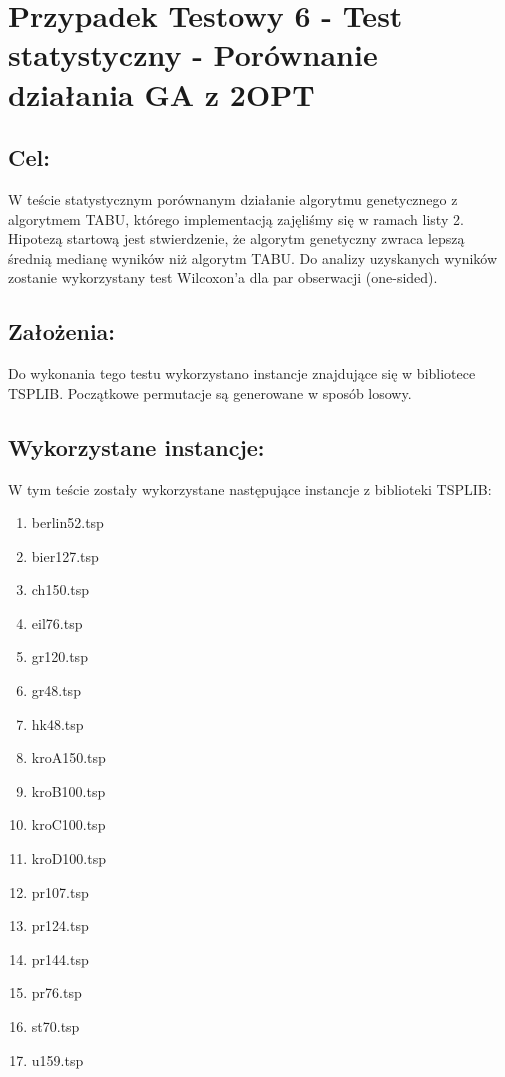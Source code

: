 \section{Przypadek Testowy 6 - Test statystyczny - Porównanie działania GA z 2OPT}
  \subsection{Cel:}
    W teście statystycznym porównanym działanie algorytmu genetycznego z algorytmem TABU,
    którego implementacją zajęliśmy się w ramach listy 2. Hipotezą startową jest stwierdzenie, że
    algorytm genetyczny zwraca lepszą średnią medianę wyników niż algorytm TABU. Do analizy
    uzyskanych wyników zostanie wykorzystany test Wilcoxon'a dla par obserwacji (one-sided).
  \subsection{Założenia: }
    Do wykonania tego testu wykorzystano instancje znajdujące się w bibliotece TSPLIB. Początkowe permutacje są generowane w sposób
    losowy.
  \subsection{Wykorzystane instancje: }
    W tym teście zostały wykorzystane następujące instancje z biblioteki TSPLIB:
    \begin{enumerate}
      \item berlin52.tsp
      \item bier127.tsp
      \item ch150.tsp
      \item eil76.tsp
      \item gr120.tsp
      \item gr48.tsp
      \item hk48.tsp
      \item kroA150.tsp
      \item kroB100.tsp
      \item kroC100.tsp
      \item kroD100.tsp
      \item pr107.tsp
      \item pr124.tsp
      \item pr144.tsp
      \item pr76.tsp
      \item st70.tsp
      \item u159.tsp
    \end{enumerate}
